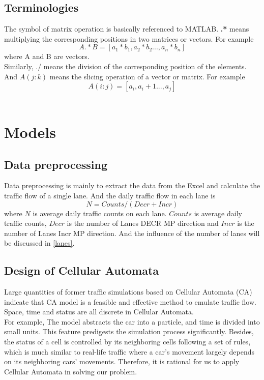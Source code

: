 \documentclass[UTF8]{mcmthesis}
\begin{document}
\subsection{Terminologies}
The symbol of matrix operation is basically referenced to MATLAB.
\textbf{.*} means multiplying the corresponding positions in two matrices or vectors. For example 
\begin{equation}
	A.*B=[a_1*b_1,a_2*b_2...,a_n*b_n]
\end{equation}
where A and B are vectors.\\
\indent Similarly, ./ means the division of the corresponding position of the elements. And $A(j:k)$ means the slicing operation of a vector or matrix. For example
\begin{equation}
A(i:j)=[a_i,a_i+1...,a_j]
\end{equation}
\
\section{Models}
\subsection{Data preprocessing}
Data preprocessing is mainly to extract the data from the Excel and calculate the traffic flow of a single lane. And the daily traffic flow in each lane is\\
\begin{equation}
N=Counts/(Decr+Incr)
\end{equation}
where $N$ is average daily traffic counts on each lane. $Counts$ is average daily traffic counts, $Decr$ is the number of Lanes DECR MP direction and $Incr$ is the number of Lanes Incr MP direction. And the influence of the number of lanes will be discussed in \ref{lanes}.\\

\subsection{Design of Cellular Automata }
Large quantities of former traffic simulations based on Cellular Automata (CA) indicate that CA model is a feasible and effective method to emulate traffic flow. Space, time and status are all discrete in Cellular Automata. \\
\indent For example, The model abstracts the car into a particle, and time is divided into small units. This feature predigests the simulation process significantly. Besides, the status of a cell is controlled by its neighboring cells following a set of rules, which is much similar to real-life traffic where a car's movement largely depends on its neighboring cars' movements. Therefore, it is rational for us to apply Cellular Automata in solving our problem.\\
\end{document}
